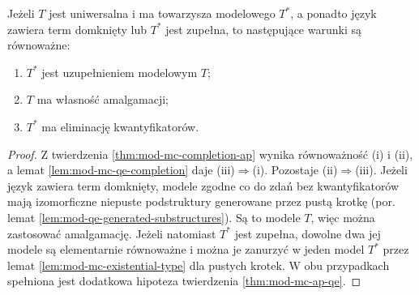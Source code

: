 \begin{wniosek}
\label{cor:mod-mc-ap-qe-standard}
Jeżeli $T$ jest uniwersalna i ma towarzysza modelowego
$T^*$, a ponadto język zawiera term domknięty lub
$T^*$ jest zupełna, to następujące warunki są
równoważne:
\begin{enumerate}[label=(\roman*)]
\item $T^*$ jest uzupełnieniem modelowym $T$;
\item $T$ ma własność amalgamacji;
\item $T^*$ ma eliminację kwantyfikatorów.
\end{enumerate}
\end{wniosek}
\begin{proof}
Z twierdzenia \ref{thm:mod-mc-completion-ap}
wynika równoważność (i) i (ii), a lemat
\ref{lem:mod-mc-qe-completion} daje (iii)$\Rightarrow$(i).
Pozostaje (ii)$\Rightarrow$(iii).
Jeżeli język zawiera term domknięty, modele
zgodne co do zdań bez kwantyfikatorów mają
izomorficzne niepuste podstruktury generowane
przez pustą krotkę (por. lemat
\ref{lem:mod-qe-generated-substructures}).
Są to modele $T$, więc można zastosować amalgamację.
Jeżeli natomiast $T^*$ jest zupełna, dowolne dwa
jej modele są elementarnie równoważne i można
je zanurzyć w jeden model $T^*$ przez lemat
\ref{lem:mod-mc-existential-type} dla pustych krotek.
W obu przypadkach spełniona jest dodatkowa hipoteza
twierdzenia \ref{thm:mod-mc-ap-qe}.
\end{proof}

